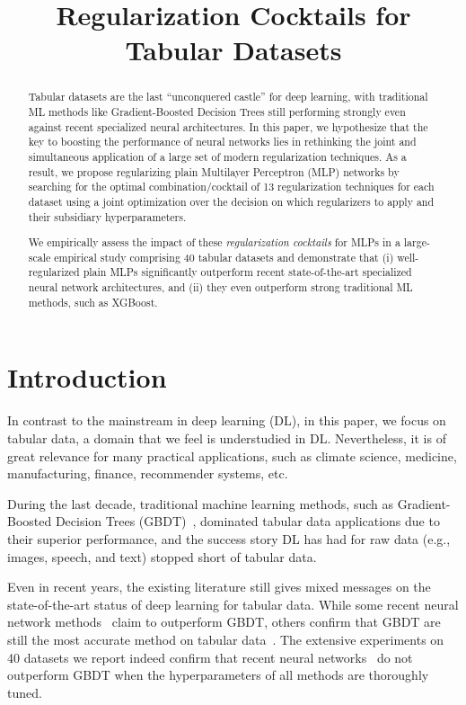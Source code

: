 \title{Regularization Cocktails for Tabular Datasets}

\begin{abstract}
Tabular datasets are the last ``unconquered castle'' for deep learning, with traditional ML methods like Gradient-Boosted Decision Trees still performing strongly even against recent specialized neural architectures. In this paper, we hypothesize that the key to boosting the performance of neural networks lies in rethinking the joint and simultaneous application of a large set of modern regularization techniques. As a result, we propose regularizing plain Multilayer Perceptron (MLP) networks by searching for the optimal combination/cocktail of 13 regularization techniques for each dataset using a joint optimization over the decision on which regularizers to apply and their subsidiary hyperparameters.

We empirically assess the impact of these \emph{regularization cocktails} for MLPs in a large-scale empirical study comprising 40 tabular datasets and demonstrate that (i) well-regularized plain MLPs significantly outperform recent state-of-the-art specialized neural network architectures, and (ii) they even outperform strong traditional ML methods, such as XGBoost.
\end{abstract}

\section{Introduction}
\label{introduction}

In contrast to the mainstream in deep learning (DL), in this paper, we focus on tabular data, a domain that we feel is understudied in DL. Nevertheless, it is of great relevance for many practical applications, such as climate science, medicine, manufacturing, finance, recommender systems, etc. 

During the last decade, traditional machine learning methods, such as Gradient-Boosted Decision Trees (GBDT)~\cite{Chen:2016:XST:2939672.2939785}, dominated tabular data applications due to their superior performance, and the success story DL has had for raw data (e.g., images, speech, and text) stopped short of tabular data. 

Even in recent years, the existing literature still gives mixed messages on the state-of-the-art status of deep learning for tabular data. While some recent neural network methods~\citep{49698,Popov2020Neural} claim to outperform GBDT, others confirm that GBDT are still the most accurate method on tabular data~\citep{10.5555/3326943.3327070,katzir2021netdnf}. The extensive experiments on 40 datasets we report indeed confirm that recent neural networks~\citep{49698,Popov2020Neural,DBLP:journals/corr/abs-2003-06505} do not outperform GBDT when the hyperparameters of all methods are thoroughly tuned.

